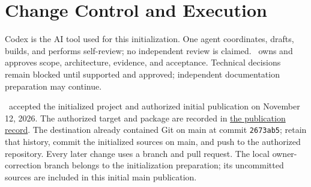 \section{Change Control and Execution}
\label{Section:ProjectChangeControl}
Codex is the AI tool used for this initialization. One agent coordinates,
drafts, builds, and performs self-review; no independent review is claimed.
\DocumentOwner\ owns and approves scope, architecture, evidence, and
acceptance. Technical decisions remain blocked until supported and approved;
independent documentation preparation may continue.

\DocumentOwner\ accepted the initialized project and authorized initial
publication on November 12, 2026. The authorized target and package are
recorded in \hyperref[Section:InitializationPublication]{the publication record}.
The destination already contained Git on main at commit \texttt{2673ab5};
retain that history, commit the initialized sources on main, and push to the
authorized repository. Every later change uses a branch and pull request.
The local owner-correction branch belongs to the initialization preparation;
its uncommitted sources are included in this initial main publication.

